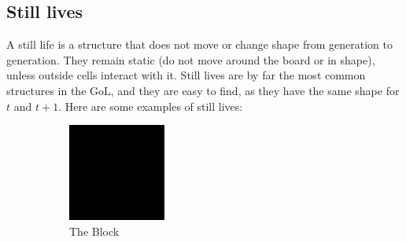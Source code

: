 \documentclass{l4proj}
\begin{document}
\subsection{Still lives}

A still life is a structure that does not move or change shape from generation to generation. They remain static (do not move around the board or in shape), unless outside cells interact with it. Still lives are by far the most common structures in the GoL, and they are easy to find, as they have the same shape for $t$ and $t+1$. Here are some examples of still lives:

\begin{figure}[h]
\centering
\begin{subfigure}[b]{0.2\textwidth}
    \includegraphics[width=\textwidth]{dissertation/images/gol_structures/still_life_1.png} 
    \caption{The Block} %
    \label{fig:subim1}
\end{subfigure}
\hfill
\begin{subfigure}[b]{0.2\textwidth}

\end{subfigure}
\end{figure}
\end{document}
